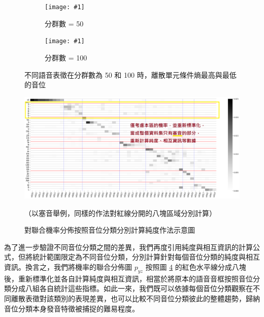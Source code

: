 {

\newcommand{\jeffheightt}[1]{\texttt{[image: \#1]}}

\begin{figure}
     \centering
     \begin{subfigure}{\textwidth}  %
         \centering
         \jeffheightt{figures/phnrank50.png}
         \caption{分群數 = 50}
         \label{fig:phn-specials-clu50}
     \end{subfigure}
     \vfill

     \begin{subfigure}{\textwidth}  %
         \centering
         \jeffheightt{figures/phnrank100.png}
         \caption{分群數 = 100}
         \label{fig:phn-specials-clu100}
     \end{subfigure}

     \caption{不同語音表徵在分群數為 50 和 100 時，離散單元條件熵最高與最低的音位}
     \label{fig:phn-specials}
\end{figure}

}



\begin{figure}
    \centering
    \includegraphics[width=1\linewidth]{figures/better-demo-splitter.png}
    \caption{對聯合機率分佈按照音位分類分別計算純度作法示意圖}
    （以塞音舉例，同樣的作法對紅線分開的八塊區域分別計算）
    \label{fig:demo-splitter}
\end{figure}


        為了進一步驗證不同音位分類之間的差異，我們再度引用純度與相互資訊的計算公式，但將統計範圍限定為不同音位分類，分別計算針對每個音位分類的純度與相互資訊。換言之，我們將機率的聯合分佈圖 $p_{yz}$ 按照圖 \ref{fig:demo-splitter} 的紅色水平線分成八塊後，重新標準化並各自計算純度與相互資訊，相當於將原本的語音音框按照音位分類分成八組各自統計這些指標。如此一來，我們既可以依據每個音位分類觀察在不同離散表徵對該類別的表現差異，也可以比較不同音位分類彼此的整體趨勢，歸納音位分類本身發音特徵被捕捉的難易程度。

